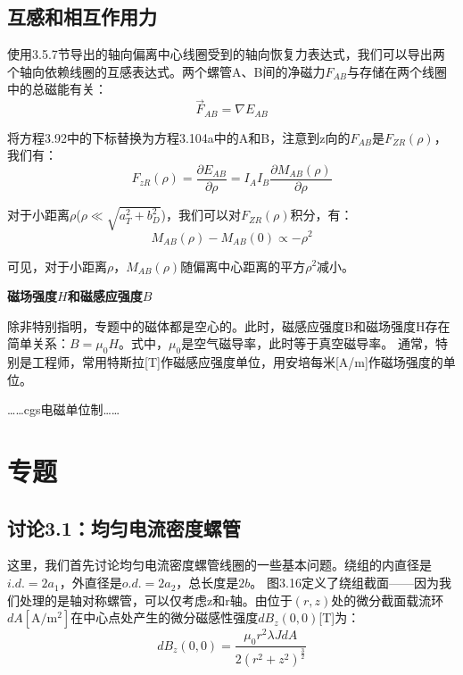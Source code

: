 \subsection{互感和相互作用力}
使用3.5.7节导出的轴向偏离中心线圈受到的轴向恢复力表达式，我们可以导出两个轴向依赖线圈的互感表达式。两个螺管A、B间的净磁力$F_{AB}$与存储在两个线圈中的总磁能有关：
\begin{equation}
\overrightarrow{F}_{AB}=\nabla E_{AB}%
\end{equation}

将方程3.92中的下标替换为方程3.104a中的A和B，注意到z向的$F_{AB}$是$F_{ZR}(\rho)$，我们有：
\begin{equation}
F_{zR}(\rho)=\frac{\partial E_{AB}}{\partial \rho}=I_AI_B\frac{\partial M_{AB}(\rho)}{\partial \rho}%
\end{equation}

对于小距离$\rho$($\rho\ll \sqrt{a_T^2+b_D^2}$)，我们可以对$F_{ZR}(\rho)$积分，有：
\begin{equation}
M_{AB}(\rho)-M_{AB}(0)\propto-\rho^2%
\end{equation}

可见，对于小距离$\rho$，$M_{AB}(\rho)$随偏离中心距离的平方$\rho^2$减小。 


\textbf{磁场强度$H$和磁感应强度$B$}

除非特别指明，专题中的磁体都是空心的。此时，磁感应强度B和磁场强度H存在简单关系：$B=\mu_0 H$。式中，$\mu_0$是空气磁导率，此时等于真空磁导率。
通常，特别是工程师，常用特斯拉[T]作磁感应强度单位，用安培每米[A/m]作磁场强度的单位。

……cgs电磁单位制……

\newpage
\section{专题}
\subsection{讨论3.1：均匀电流密度螺管}

这里，我们首先讨论均匀电流密度螺管线圈的一些基本问题。绕组的内直径是$i.d.=2a_1$，外直径是$o.d.=2a_2$，总长度是$2b$。
图3.16定义了绕组截面——因为我们处理的是轴对称螺管，可以仅考虑z和r轴。由位于$(r,z)$处的微分截面载流环$dA \mathrm{[A/m^2]}$在中心点处产生的微分磁感性强度$dB_z(0, 0)$[T]为：
\begin{equation}
dB_z(0,0)=\frac{\mu_0r^2\lambda JdA}{2(r^2+z^2)^\frac{3}{2}}%
\end{equation}

